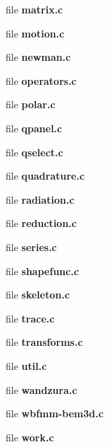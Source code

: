 \begin{DoxyCompactItemize}
\item 
file {\bfseries matrix.\+c}
\item 
file {\bfseries motion.\+c}
\item 
file {\bfseries newman.\+c}
\item 
file {\bfseries operators.\+c}
\item 
file {\bfseries polar.\+c}
\item 
file {\bfseries qpanel.\+c}
\item 
file {\bfseries qselect.\+c}
\item 
file {\bfseries quadrature.\+c}
\item 
file {\bfseries radiation.\+c}
\item 
file {\bfseries reduction.\+c}
\item 
file {\bfseries series.\+c}
\item 
file {\bfseries shapefunc.\+c}
\item 
file {\bfseries skeleton.\+c}
\item 
file {\bfseries trace.\+c}
\item 
file {\bfseries transforms.\+c}
\item 
file {\bfseries util.\+c}
\item 
file {\bfseries wandzura.\+c}
\item 
file {\bfseries wbfmm-\/bem3d.\+c}
\item 
file {\bfseries work.\+c}
\end{DoxyCompactItemize}
